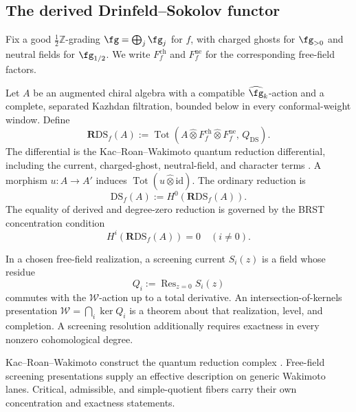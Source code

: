 \subsection{The derived Drinfeld--Sokolov functor}
\label{sec:ds-derived-foundation}

Fix a good \(\frac12\mathbb Z\)-grading
\(\fg=\bigoplus_j\fg_j\) for \(f\), with charged ghosts for
\(\fg_{>0}\) and neutral fields for \(\fg_{1/2}\).  We write
\(F^{\mathrm{ch}}_f\) and \(F^{\mathrm{ne}}_f\) for the corresponding
free-field factors.

\begin{definition}
\label{def:filtered-derived-ds-functor}
Let \(A\) be an augmented chiral algebra with a compatible
\(\widehat\fg_k\)-action and a complete, separated Kazhdan
filtration, bounded below in every conformal-weight window.  Define
\[
\mathbf R\mathrm{DS}_f(A)
:=
\operatorname{Tot}\!\left(
A\widehat\otimes F^{\mathrm{ch}}_f
\widehat\otimes F^{\mathrm{ne}}_f,\,
Q_{\mathrm{DS}}
\right).
\]
The differential is the Kac--Roan--Wakimoto quantum reduction
differential, including the current, charged-ghost, neutral-field,
and character terms \cite{KRW}.  A morphism \(u\colon A\to A'\)
induces
\(\operatorname{Tot}(u\widehat\otimes\mathrm{id})\).
The ordinary reduction is
\[
\mathrm{DS}_f(A):=H^0\!\left(\mathbf R\mathrm{DS}_f(A)\right).
\]
The equality of derived and degree-zero reduction is governed by the
BRST concentration condition
\[
H^i\!\left(\mathbf R\mathrm{DS}_f(A)\right)=0
\quad (i\ne0).
\]
\end{definition}

\begin{definition}
\label{def:screening}
\ClaimStatusDefinitional
{}
In a chosen free-field realization, a screening current \(S_i(z)\)
is a field whose residue
\[
Q_i:=\operatorname{Res}_{z=0}S_i(z)
\]
commutes with the \(\mathcal W\)-action up to a total derivative.
An intersection-of-kernels presentation
\(\mathcal W=\bigcap_i\ker Q_i\) is a theorem about that realization,
level, and completion.  A screening resolution additionally requires
exactness in every nonzero cohomological degree.
\end{definition}

\begin{remark}
Kac--Roan--Wakimoto construct the quantum reduction complex
\cite{KRW}.  Free-field screening presentations supply an effective
description on generic Wakimoto lanes.  Critical, admissible, and
simple-quotient fibers carry their own concentration and exactness
statements.
\end{remark}

